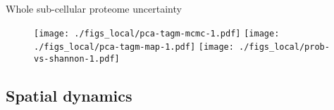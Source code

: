 \begin{frame}{Whole sub-cellular proteome uncertainty}
  \begin{figure}
    \centering
    \texttt{[image: ./figs\_local/pca-tagm-mcmc-1.pdf]}
    \texttt{[image: ./figs\_local/pca-tagm-map-1.pdf]}
    \texttt{[image: ./figs\_local/prob-vs-shannon-1.pdf]}
  \end{figure}
\end{frame}





\subsection{Spatial dynamics}

